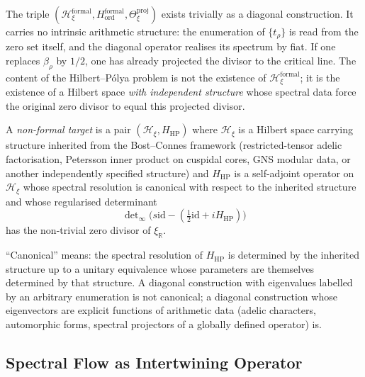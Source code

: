 \begin{remark}
\label{v4-arith:w9-r4:rem:why-formal}
The triple \((\mathcal{H}_{\xi}^{\mathrm{formal}},H_{\mathrm{ord}}^{\mathrm{formal}},\Theta_{\xi}^{\mathrm{proj}})\)
exists trivially as a diagonal construction. It carries no
intrinsic arithmetic structure: the enumeration of
\(\{t_{\rho}\}\) is read from the zero set itself, and the diagonal
operator realises its spectrum by fiat. If one replaces
\(\beta_{\rho}\) by \(1/2\), one has already projected the divisor to
the critical line. The content of the Hilbert--P\'olya problem is
not the existence of \(\mathcal{H}_{\xi}^{\mathrm{formal}}\); it is
the existence of a Hilbert space \emph{with independent structure}
whose spectral data force the original zero divisor to equal this
projected divisor.
\end{remark}

\begin{definition}
\label{v4-arith:w9-r4:def:non-formal-target}
\ClaimStatusDefinitional A \emph{non-formal target} is a pair
\((\mathcal{H}_{\xi},H_{\mathrm{HP}})\) where \(\mathcal{H}_{\xi}\) is a
Hilbert space carrying structure inherited from the Bost--Connes
framework (restricted-tensor adelic factorisation, Petersson inner
product on cuspidal cores, GNS modular data, or another
independently specified structure) and \(H_{\mathrm{HP}}\) is a
self-adjoint operator on \(\mathcal{H}_{\xi}\) whose spectral
resolution is canonical with respect to the inherited structure and
whose regularised determinant
\[
\det\nolimits_{\infty}\bigl(s\mathrm{id}-(\tfrac12\mathrm{id}+iH_{\mathrm{HP}})\bigr)
\]
has the non-trivial zero divisor of \(\xi_{\mathbb R}\).
\end{definition}

\begin{remark}
\label{v4-arith:w9-r4:rem:canonical-domain}
``Canonical'' means: the spectral resolution of \(H_{\mathrm{HP}}\) is
determined by the inherited structure up to a unitary equivalence
whose parameters are themselves determined by that structure. A
diagonal construction with eigenvalues labelled by an arbitrary
enumeration is not canonical; a diagonal construction whose
eigenvectors are explicit functions of arithmetic data (adelic
characters, automorphic forms, spectral projectors of a globally
defined operator) is.
\end{remark}

\subsection{Spectral Flow as Intertwining Operator}
\label{v4-arith:w9-r4:setup:flow}

